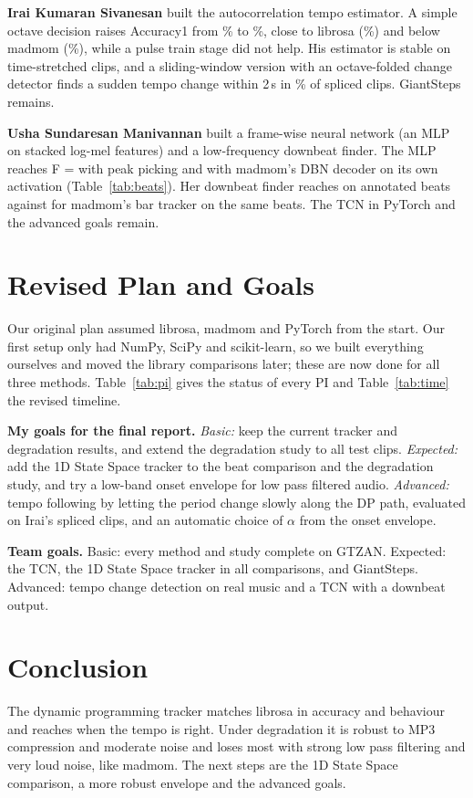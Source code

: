 \documentclass{article}
\begin{document}
\textbf{Irai Kumaran Sivanesan} built the autocorrelation tempo estimator. A simple octave decision raises Accuracy1 from \AccOneAC{}\% to \AccOnePrior{}\%, close to librosa (\AccOneLibrosa{}\%) and below madmom (\AccOneMadmom{}\%), while a pulse train stage did not help. His estimator is stable on time-stretched clips, and a sliding-window version with an octave-folded change detector finds a sudden tempo change within 2\,s in \DetFoldTwo{}\% of spliced clips. GiantSteps remains.

\textbf{Usha Sundaresan Manivannan} built a frame-wise neural network (an MLP on stacked log-mel features) and a low-frequency downbeat finder. The MLP reaches F = \NNF{} with peak picking and \NNDBNF{} with madmom's DBN decoder on its own activation (Table~\ref{tab:beats}). Her downbeat finder reaches \DBOracle{} on annotated beats against \DBMadBar{} for madmom's bar tracker on the same beats. The TCN in PyTorch and the advanced goals remain.

\PITable
\TimelineTable

\section{Revised Plan and Goals}

Our original plan assumed librosa, madmom and PyTorch from the start. Our first setup only had NumPy, SciPy and scikit-learn, so we built everything ourselves and moved the library comparisons later; these are now done for all three methods. Table~\ref{tab:pi} gives the status of every PI and Table~\ref{tab:time} the revised timeline.

\textbf{My goals for the final report.}
\emph{Basic:} keep the current tracker and degradation results, and extend the degradation study to all \NBeat{} test clips.
\emph{Expected:} add the 1D State Space tracker \cite{heydari} to the beat comparison and the degradation study, and try a low-band onset envelope for low pass filtered audio.
\emph{Advanced:} tempo following by letting the period change slowly along the DP path, evaluated on Irai's spliced clips, and an automatic choice of $\alpha$ from the onset envelope.

\textbf{Team goals.} Basic: every method and study complete on GTZAN. Expected: the TCN, the 1D State Space tracker in all comparisons, and GiantSteps. Advanced: tempo change detection on real music and a TCN with a downbeat output.

\section{Conclusion}

The dynamic programming tracker matches librosa in accuracy and behaviour and reaches \DPOracleF{} when the tempo is right. Under degradation it is robust to MP3 compression and moderate noise and loses most with strong low pass filtering and very loud noise, like madmom. The next steps are the 1D State Space comparison, a more robust envelope and the advanced goals.


\end{document}
